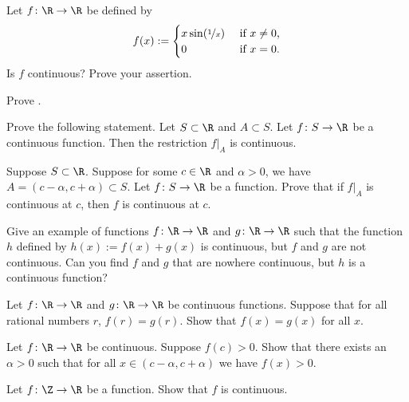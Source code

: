 \documentclass[12pt]{book}
\begin{document}
\begin{exercise}
Let $f \colon \R \to \R$ be
defined by
\begin{equation*}
f(x) :=
\begin{cases}
x \sin(\nicefrac{1}{x}) & \text{ if $x \not= 0$,} \\
0 & \text{ if $x=0$.}
\end{cases}
\end{equation*}
Is $f$ continuous?
  Prove your assertion.
\end{exercise}

\begin{exercise}
Prove .
\end{exercise}

\begin{exercise}
Prove the following statement.
Let $S \subset \R$ and $A \subset S$.
Let $f \colon S \to \R$
be a continuous function.
Then the restriction $f|_A$ is continuous.
\end{exercise}

\begin{exercise}
Suppose $S \subset \R$.
Suppose for some $c \in \R$
and $\alpha > 0$, we have $A=(c-\alpha,c+\alpha) \subset S$.
Let $f \colon S \to \R$ be a function.
Prove that
if $f|_A$ is continuous at $c$, then $f$ is continuous at $c$.
\end{exercise}

\begin{exercise}
Give an example of functions $f \colon \R \to \R$ and $g \colon \R \to \R$
such that the function $h$ defined by $h(x) := f(x) + g(x)$ is continuous,
but $f$ and $g$ are not continuous.
Can you find $f$ and $g$ that are nowhere
continuous, but $h$ is a continuous function?
\end{exercise}

\begin{exercise}
Let $f \colon \R \to \R$ and 
$g \colon \R \to \R$ be continuous functions.
Suppose that for
all rational numbers $r$, $f(r) = g(r)$.
Show that $f(x) = g(x)$ for all
$x$.
\end{exercise}

\begin{exercise}
Let $f \colon \R \to \R$ be continuous.
Suppose $f(c) > 0$.
Show that
there exists an $\alpha > 0$ such that for all $x \in (c-\alpha,c+\alpha)$
we have $f(x) > 0$.
\end{exercise}

\begin{exercise}
Let $f \colon \Z \to \R$ be a function.
Show that $f$ is continuous.
\end{exercise}
\end{document}
